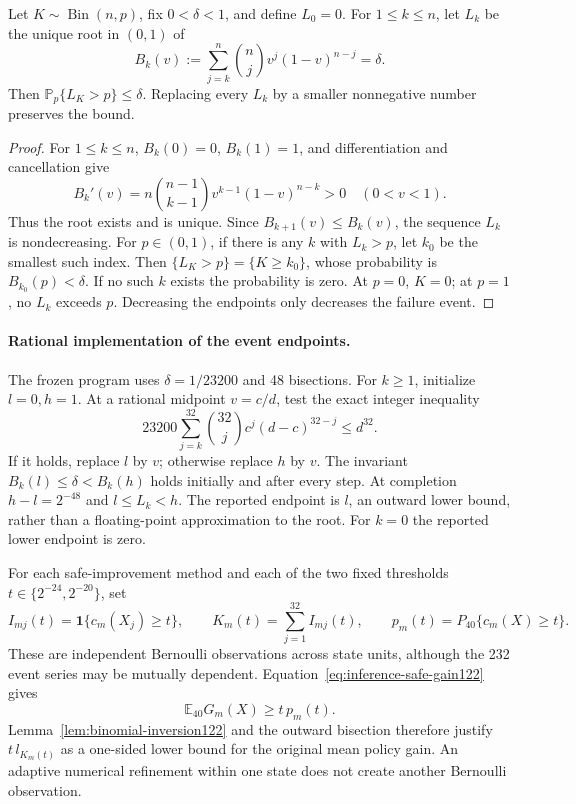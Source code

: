 \begin{lemma}
\label{lem:binomial-inversion122}
Let \(K\sim\operatorname{Bin}(n,p)\), fix \(0<\delta<1\), and define
\(L_0=0\). For \(1\le k\le n\), let \(L_k\) be the unique root in
\((0,1)\) of
\[
 B_k(v):=\sum_{j=k}^n {n\choose j}v^j(1-v)^{n-j}=\delta.
\]
Then \(\mathbb P_p\{L_K>p\}\le\delta\). Replacing every \(L_k\) by a
smaller nonnegative number preserves the bound.
\end{lemma}

\begin{proof}
For \(1\le k\le n\), \(B_k(0)=0\), \(B_k(1)=1\), and differentiation
and cancellation give
\[
 B_k'(v)=n{n-1\choose k-1}v^{k-1}(1-v)^{n-k}>0
 \quad(0<v<1).
\]
Thus the root exists and is unique. Since \(B_{k+1}(v)\le B_k(v)\),
the sequence \(L_k\) is nondecreasing. For \(p\in(0,1)\), if there is
any \(k\) with \(L_k>p\), let \(k_0\) be the smallest such index.
Then \(\{L_K>p\}=\{K\ge k_0\}\), whose probability is
\(B_{k_0}(p)<\delta\). If no such \(k\) exists the probability is zero.
At \(p=0\), \(K=0\); at \(p=1\), no \(L_k\) exceeds \(p\).
Decreasing the endpoints only decreases the failure event.
\end{proof}

\paragraph{Rational implementation of the event endpoints.}
The frozen program uses \(\delta=1/23200\) and 48 bisections. For
\(k\ge1\), initialize \(l=0,h=1\). At a rational midpoint \(v=c/d\),
test the exact integer inequality
\begin{equation}
 23200\sum_{j=k}^{32}{32\choose j}c^j(d-c)^{32-j}
 \le d^{32}.
 \label{eq:binomial-integer122}
\end{equation}
If it holds, replace \(l\) by \(v\); otherwise replace \(h\) by \(v\).
The invariant \(B_k(l)\le\delta<B_k(h)\) holds initially and after every
step. At completion \(h-l=2^{-48}\) and
\(l\le L_k<h\). The reported endpoint is \(l\), an outward lower
bound, rather than a floating-point approximation to the root. For
\(k=0\) the reported lower endpoint is zero.

For each safe-improvement method and each of the two fixed thresholds
\(t\in\{2^{-24},2^{-20}\}\), set
\[
 I_{mj}(t)=\mathbf 1\{c_m(X_j)\ge t\},\qquad
 K_m(t)=\sum_{j=1}^{32} I_{mj}(t),\qquad
 p_m(t)=P_{40}\{c_m(X)\ge t\}.
\]
These are independent Bernoulli observations across state units,
although the 232 event series may be mutually dependent.
Equation~\eqref{eq:inference-safe-gain122} gives
\[
 \mathbb E_{40}G_m(X)\ge t\,p_m(t).
\]
Lemma~\ref{lem:binomial-inversion122} and the outward bisection
therefore justify \(t\,l_{K_m(t)}\) as a one-sided lower bound for
the original mean policy gain. An adaptive numerical refinement within
one state does not create another Bernoulli observation.

